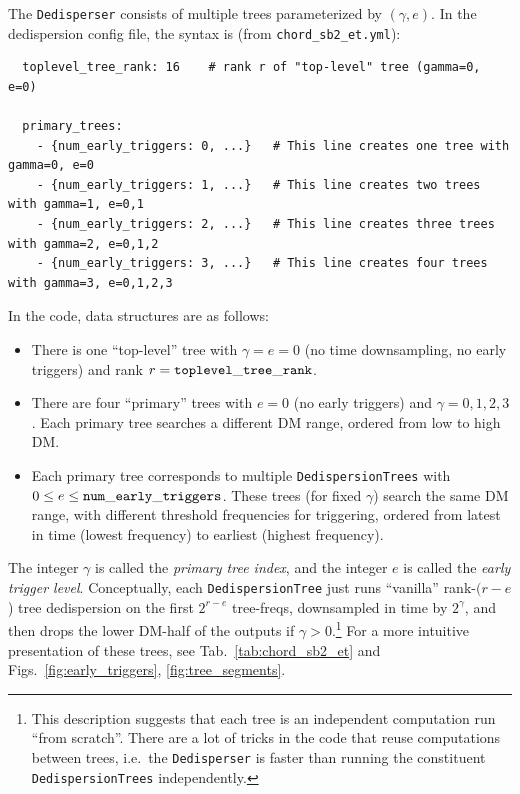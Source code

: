 \documentclass{article}
\numberwithin{equation}{section}   %
\begin{document}
\par\noindent
The {\tt Dedisperser} consists of multiple trees parameterized by $(\gamma,e)$.
In the dedispersion config file, the syntax is (from {\tt chord\_sb2\_et.yml}):
\begin{verbatim}
  toplevel_tree_rank: 16    # rank r of "top-level" tree (gamma=0, e=0)

  primary_trees:
    - {num_early_triggers: 0, ...}   # This line creates one tree with gamma=0, e=0
    - {num_early_triggers: 1, ...}   # This line creates two trees with gamma=1, e=0,1
    - {num_early_triggers: 2, ...}   # This line creates three trees with gamma=2, e=0,1,2
    - {num_early_triggers: 3, ...}   # This line creates four trees with gamma=3, e=0,1,2,3
\end{verbatim}
In the code, data structures are as follows:
\begin{itemize}
\item There is one ``top-level'' tree with $\gamma=e=0$ (no time downsampling, no early triggers) and rank $r = {\tt toplevel\_tree\_rank}$.
\item There are four ``primary'' trees with $e=0$ (no early triggers) and $\gamma=0,1,2,3$.
Each primary tree searches a different DM range, ordered from low to high DM.
\item Each primary tree corresponds to multiple {\tt DedispersionTrees} with $0 \le e \le {\tt num\_early\_triggers}$.
These trees (for fixed $\gamma$) search the same DM range, with different threshold frequencies for triggering, ordered from latest in time (lowest frequency) to earliest (highest frequency).
\end{itemize}
The integer $\gamma$ is called the {\em primary tree index}, and the integer $e$ is called the {\em early trigger level}.
Conceptually, each {\tt DedispersionTree} just runs ``vanilla'' rank-$(r-e$) tree dedispersion on the first $2^{r-e}$ tree-freqs, downsampled in time by $2^\gamma$, and then drops the lower DM-half of the outputs if $\gamma > 0$.\footnote{This description suggests that each tree is an independent computation run ``from scratch''. There are a lot of tricks in the code that reuse computations between trees, i.e.\ the {\tt Dedisperser} is faster than running the constituent {\tt DedispersionTrees} independently.}
For a more intuitive presentation of these trees, see Tab.\ \ref{tab:chord_sb2_et} and Figs.\ \ref{fig:early_triggers}, \ref{fig:tree_segments}.
\end{document}
